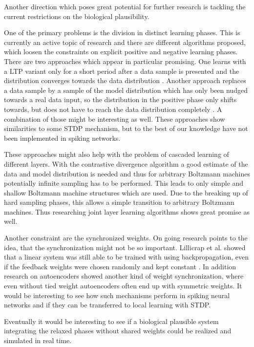 Another direction which poses great potential for further research is tackling the current restrictions on the biological plausibility.  

One of the primary problems is the division in distinct learning phases.
This is currently an active topic of research and there are different algorithms proposed, which loosen the constraints on explicit positive and negative learning phases.
There are two approaches which appear in particular promising.
One learns with a LTP variant only for a short period after a data sample is presented and the distribution converges towards the data distribution \cite{DBLP:journals/corr/ScellierB16}.
Another approach replaces a data sample by a sample of the model distribution which has only been nudged towards a real data input, so the distribution in the positive phase only shifts towards, but does not have to reach the data distribution completely \cite{Scellier2016a}.
A combination of those might be interesting as well.
These approaches show similarities to some STDP mechanism, but to the best of our knowledge have not been implemented in spiking networks.

These approaches might also help with the problem of cascaded learning of different layers.
With the contrastive divergence algorithm a good estimate of the data and model distribution is needed and thus for arbitrary Boltzmann machines potentially infinite sampling has to be performed.
This leads to only simple and shallow Boltzmann machine structures which are used.
Due to the breaking up of hard sampling phases, this allows a simple transition to arbitrary Boltzmann machines.
Thus researching joint layer learning algorithms shows great promise as well.

Another constraint are the synchronized weights.
On going research points to the idea, that the synchronization might not be so important.
Lillicrap et al. showed that a linear system was still able to be trained with using backpropagation, even if the feedback weights were chosen randomly and kept constant \cite{Lillicrap2014}.
In addition research on autoencoders showed another kind of weight synchronization, where even without tied weight autoencoders often end up with symmetric weights\cite{vincent2010stacked}.
It would be interesting to see how such mechanisms perform in spiking neural networks and if they can be transferred to local learning with STDP.

Eventually it would be interesting to see if a biological plausible system integrating the relaxed phases without shared weights could be realized and simulated in real time.
 